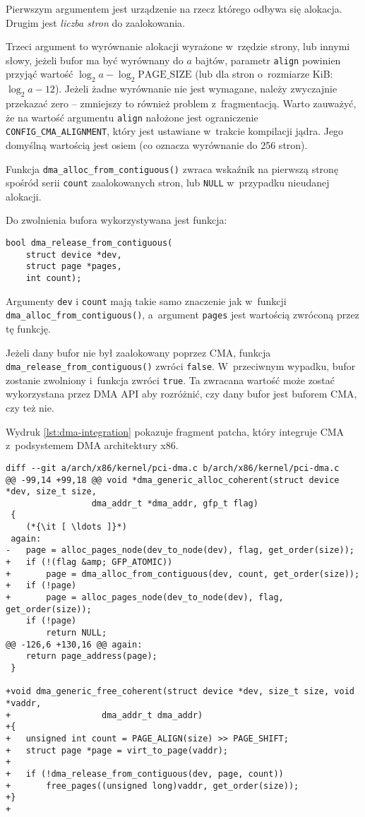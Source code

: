 Pierwszym argumentem jest urządzenie na rzecz którego odbywa się
alokacja.  Drugim jest \emph{liczba stron} do zaalokowania.

Trzeci argument to wyrównanie alokacji wyrażone w~rzędzie strony, lub
innymi słowy, jeżeli bufor ma być wyrównany do $a$ bajtów, parametr
\lstinline|align| powinien przyjąć wartość $\log_2 a - \log_2
\mathrm{PAGE\_SIZE}$ (lub dla stron o~rozmiarze \unit[4096]{KiB}:
$\log_2 a - 12$).  Jeżeli żadne wyrównanie nie jest wymagane, należy
zwyczajnie przekazać zero -- zmniejszy to również problem
z~fragmentacją.  Warto zauważyć, że na wartość argumentu
\lstinline|align| nałożone jest ograniczenie
\lstinline|CONFIG_CMA_ALIGNMENT|, który jest ustawiane w~trakcie
kompilacji jądra.  Jego domyślną wartością jest osiem (co oznacza
wyrównanie do 256 stron).

Funkcja \lstinline|dma_alloc_from_contiguous()| zwraca wskaźnik na
pierwszą stronę spośród serii \lstinline|count| zaalokowanych stron,
lub \lstinline|NULL| w~przypadku nieudanej alokacji.

Do zwolnienia bufora wykorzystywana jest funkcja:

\begin{lstlisting}
bool dma_release_from_contiguous(
	struct device *dev,
	struct page *pages,
	int count);
\end{lstlisting}

Argumenty \lstinline|dev| i \lstinline|count| mają takie samo
znaczenie jak w~funkcji \lstinline|dma_alloc_from_contiguous()|,
a~argument \lstinline|pages| jest wartością zwróconą przez tę funkcję.

Jeżeli dany bufor nie był zaalokowany poprzez CMA, funkcja
\lstinline|dma_release_from_contiguous()| zwróci \lstinline|false|.
W~przeciwnym wypadku, bufor zostanie zwolniony i~funkcja zwróci
\lstinline|true|.  Ta zwracana wartość może zostać wykorzystana przez
DMA API aby rozróżnić, czy dany bufor jest buforem CMA, czy też nie.

Wydruk \ref{lst:dma-integration} pokazuje fragment patcha, który
integruje CMA z~podsystemem DMA architektury x86.

\begin{lstlisting}[float=tbhp,caption={Integracja CMA z~podsystemem DMA
      architektury x86.},label=lst:dma-integration]
diff --git a/arch/x86/kernel/pci-dma.c b/arch/x86/kernel/pci-dma.c
@@ -99,14 +99,18 @@ void *dma_generic_alloc_coherent(struct device *dev, size_t size,
 				 dma_addr_t *dma_addr, gfp_t flag)
 {
	(*{\it [ \ldots ]}*)
 again:
-	page = alloc_pages_node(dev_to_node(dev), flag, get_order(size));
+	if (!(flag &amp; GFP_ATOMIC))
+		page = dma_alloc_from_contiguous(dev, count, get_order(size));
+	if (!page)
+		page = alloc_pages_node(dev_to_node(dev), flag, get_order(size));
 	if (!page)
 		return NULL;
@@ -126,6 +130,16 @@ again:
 	return page_address(page);
 }

+void dma_generic_free_coherent(struct device *dev, size_t size, void *vaddr,
+			       dma_addr_t dma_addr)
+{
+	unsigned int count = PAGE_ALIGN(size) >> PAGE_SHIFT;
+	struct page *page = virt_to_page(vaddr);
+
+	if (!dma_release_from_contiguous(dev, page, count))
+		free_pages((unsigned long)vaddr, get_order(size));
+}
+
\end{lstlisting}


